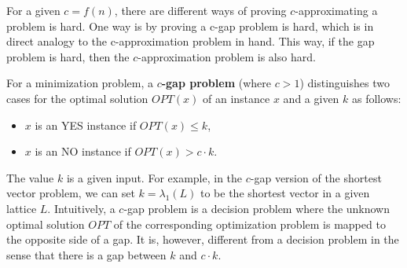 \documentclass[../main.tex]{subfiles}
\begin{document}
For a given $c=f(n)$, there are different ways of proving $c$-approximating a problem is hard. One way is by proving a c-gap problem is hard, which is in direct analogy to the c-approximation problem in hand. This way, if the gap problem is hard, then the $c$-approximation problem is also hard.  

\begin{definition}
For a minimization problem, a \textbf{$c$-gap problem} 
\reversemarginpar
{}
(where $c > 1$) distinguishes two cases for the optimal solution $OPT(x)$ of an instance $x$ and a given $k$ as follows:
\begin{itemize}
    \item $x$ is an YES instance if $OPT(x) \le k$,
    \item $x$ is an NO instance if $OPT(x) > c\cdot k$.
\end{itemize}
\end{definition}

The value $k$ is a given input. For example, in the $c$-gap version of the shortest vector problem, we can set $k=\lambda_1(L)$ to be the shortest vector in a given lattice $L$. Intuitively, a $c$-gap problem is a decision problem where the unknown optimal solution $OPT$ of the corresponding optimization problem is mapped to the opposite side of a gap. It is, however, different from a decision problem in the sense that there is a gap between $k$ and $c\cdot k$.

\end{document}
